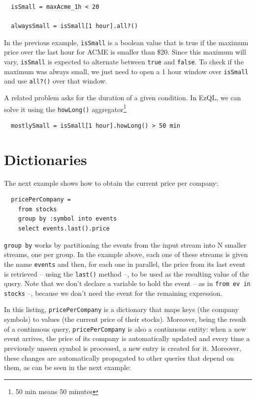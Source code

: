 \begin{lstlisting}
  isSmall = maxAcme_1h < 20

  alwaysSmall = isSmall[1 hour].all?()
\end{lstlisting}

In the previous example, \verb=isSmall= is a boolean value that is
true if the maximum price over the last hour for ACME is smaller than
\$20. Since this maximum will vary, \verb=isSmall= is expected to
alternate between \verb=true= and \verb=false=. To check if the
maximum was always small, we just need to open a 1 hour window over
\verb=isSmall= and use \verb=all?()= over that window.

A related problem asks for the duration of a given condition. In EzQL,
we can solve it using the \verb=howLong()= aggregator\footnote{50 min
  means 50 minutes}

\begin{lstlisting}
  mostlySmall = isSmall[1 hour].howLong() > 50 min
\end{lstlisting}

\section{Dictionaries}
\label{sec:dictionaries}
The next example shows how to obtain the current price per company:

\begin{lstlisting}
  pricePerCompany =
    from stocks
    group by :symbol into events
    select events.last().price
\end{lstlisting}

\verb=group by= works by partitioning the events from the input stream
into N smaller streams, one per group. In the example above, each one
of these streams is given the name \verb=events= and then, for each
one in parallel, the price from its last event is retrieved -- using
the \verb=last()= method --, to be used as the resulting value of the
query. Note that we don't declare a variable to hold the event -- as
in \verb=from ev in stocks= --, because we don't need the event for
the remaining expression.

In this listing, \verb=pricePerCompany= is a dictionary that maps keys
(the company symbols) to values (the current price of their
stocks). Moreover, being the result of a continuous query,
\verb=pricePerCompany= is also a continuous entity: when a new event
arrives, the price of its company is automatically updated and every
time a previously unseen symbol is processed, a new entry is created
for it. Moreover, these changes are automatically propagated to other
queries that depend on them, as can be seen in the next example:


